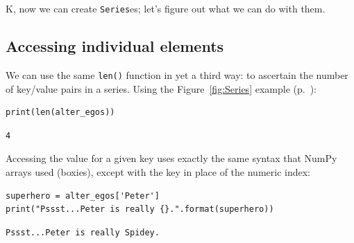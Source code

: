 


\chapter[\small Assoc.~arrays in Python (2 of 3)]{\LARGE\selectfont{Associative
arrays in Python (2 of 3)}}
\label{ch:assocArraysInPython2}

K, now we can create \texttt{Series}es; let's figure out what we can do with
them.

\section{Accessing individual elements}


We can use the same \texttt{len()} function in yet a third way: to ascertain
the number of key/value pairs in a series. Using the Figure~\ref{fig:Series}
example (p.~\pageref{fig:Series}):

\begin{Verbatim}[fontsize=\small,samepage=true,frame=single,framesep=3mm]
print(len(alter_egos))
\end{Verbatim}

\begin{Verbatim}[fontsize=\small,samepage=true,frame=leftline,framesep=5mm,framerule=1mm]
4
\end{Verbatim}


Accessing the value for a given key uses exactly the same syntax that NumPy
arrays used (boxies), except with the key in place of the numeric index:

\begin{Verbatim}[fontsize=\small,samepage=true,frame=single,framesep=3mm]
superhero = alter_egos['Peter']
print("Pssst...Peter is really {}.".format(superhero))
\end{Verbatim}

\begin{Verbatim}[fontsize=\small,samepage=true,frame=leftline,framesep=5mm,framerule=1mm]
Pssst...Peter is really Spidey.
\end{Verbatim}

